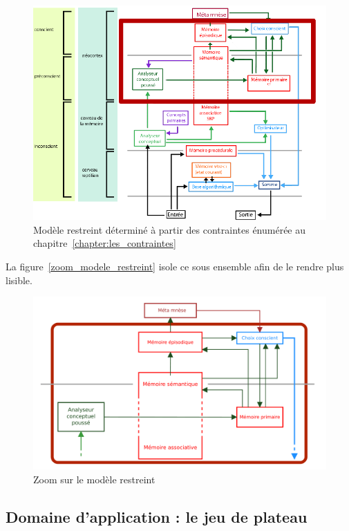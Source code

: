 \begin{figure}[H] 
\includegraphics[width=\textwidth]{files/modele_restreint} 
\caption{Modèle restreint déterminé à partir des contraintes énumérée au chapitre~\ref{chapter:les_contraintes}} 
\label{modele_restreint}
\end{figure}

La figure~\vref{zoom_modele_restreint} isole ce sous ensemble afin de le rendre plus lisible.

\begin{figure}[H] 
\includegraphics[width=\textwidth]{files/restricted_model_french} 
\caption{Zoom sur le  modèle restreint} 
\label{zoom_modele_restreint}
\end{figure}

\subsection{Domaine d'application : le jeu de plateau}
\label{section:domaine_application_le_jeu_de_plateau}


